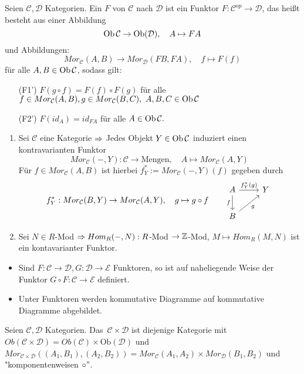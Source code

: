 \begin{df}\label{4.6}
	Seien $\mathcal{C}, \mathcal{D}$ Kategorien. Ein  $F$ von $\mathcal{C}$ nach $\mathcal{D}$ ist ein Funktor $F: \mathcal{C}^{op} \to \mathcal{D} $, das heißt besteht aus einer Abbildung $$ \text{Ob}\,\mathcal{C} \to \text{Ob}(\mathcal{D}), \quad A \mapsto FA$$
	und Abbildungen: $$ Mor_{\mathcal{C}}(A,B) \to Mor_{\mathcal{D}}(FB,FA), \quad f \mapsto F(f) $$ für alle $A,B \in \text{Ob}\,\mathcal{C}$, sodass gilt:
	\begin{enumerate}
		\item[(F1')] $F(g \circ f) = F(f) \circ F(g) $ für alle $ f \in Mor_{\mathcal{C}}(A,B), g\in Mor_{\mathcal{C}}(B,C), \ A,B,C \in \text{Ob}\,\mathcal{C}$
		\item[(F2')] $F(id_A) =id_{FA} $ für alle $A \in \text{Ob}\,\mathcal{C}.$
	\end{enumerate}
\end{df}
\begin{bsp}
		\begin{enumerate} [label= \alph*)]
		\item Sei $\mathcal{C}$ eine Kategorie $\Rightarrow$ Jedes Objekt $Y \in \text{Ob}\,\mathcal{C}$ induziert einen kontravarianten Funktor $$Mor_{\mathcal{C}}(-,Y): \mathcal{C} \to \text{Mengen}, \quad A \mapsto Mor_{\mathcal{C}}(A,Y) $$
		Für $f \in Mor_{\mathcal{C}}(A,B) $ ist hierbei $f_{Y}^{\ast} := Mor_{\mathcal{C}}(-,Y)(f)$ gegeben durch $$ f_{Y}^{\ast}: Mor_{\mathcal{C}}(B,Y) \to Mor_{\mathcal{C}}(A,Y), \quad g \mapsto g \circ f\qquad \begin{tikzcd}
		A \arrow{r}{f_Y^*(g)} \arrow[swap]{d}{f} & Y \\B \arrow[swap]{ur}{g}
		\end{tikzcd}$$
		\item Sei $N \in R$-Mod $\Rightarrow Hom_R(-,N): R$-Mod $\to \mathbb{Z}$-Mod, $M \mapsto Hom_R(M,N) $ ist ein kontavarianter Funktor.
	\end{enumerate}
\end{bsp}
\begin{anm}
	\begin{itemize}
		\item Sind $F: \mathcal{C} \to \mathcal{D}, G: \mathcal{D} \to \mathcal{E} $ Funktoren, so ist auf naheliegende Weise der Funktor $G \circ F : \mathcal{C} \to \mathcal{E}$ definiert.
		\item Unter Funktoren werden kommutative Diagramme auf kommutative Diagramme abgebildet.
	\end{itemize}
\end{anm}
\begin{df}\label{4.8}
	Seien $\mathcal{C},\mathcal{D} $ Kategorien. Das  \,$\mathcal{C} \times \mathcal{D} $ ist diejenige Kategorie mit $ Ob(\mathcal{C} \times \mathcal{D}) = Ob(\mathcal{C}) \times \text{Ob}(\mathcal{D}) $ und $ Mor_{\mathcal{C} \times \mathcal{D}}((A_1,B_1),(A_2,B_2)) = Mor_{\mathcal{C}}(A_1,A_2) \times Mor_{\mathcal{D}}(B_1,B_2)$ und "komponentenweisen $\circ"$.
\end{df}
